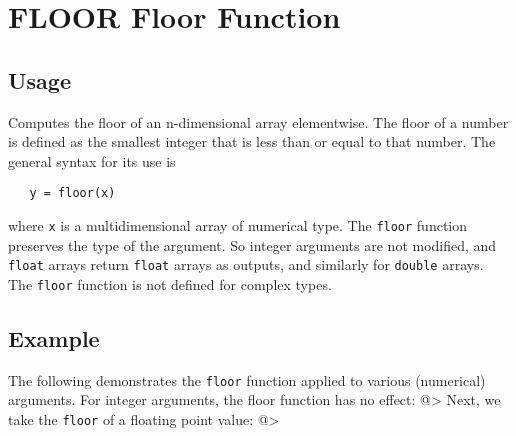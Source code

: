\section{FLOOR Floor Function}

\subsection{Usage}

Computes the floor of an n-dimensional array elementwise.  The
floor of a number is defined as the smallest integer that is
less than or equal to that number. The general syntax for its use
is
\begin{verbatim}
   y = floor(x)
\end{verbatim}
where \verb|x| is a multidimensional array of numerical type.  The \verb|floor| 
function preserves the type of the argument.  So integer arguments 
are not modified, and \verb|float| arrays return \verb|float| arrays as 
outputs, and similarly for \verb|double| arrays.  The \verb|floor| function 
is not defined for complex types.
\subsection{Example}

The following demonstrates the \verb|floor| function applied to various
(numerical) arguments.  For integer arguments, the floor function has
no effect:
@>
Next, we take the \verb|floor| of a floating point value:
@>
